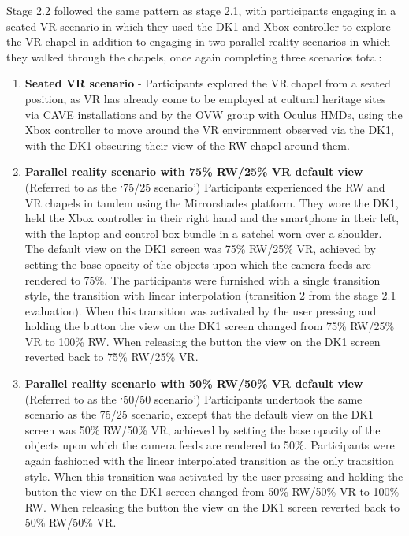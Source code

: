 Stage 2.2 followed the same pattern as stage 2.1, with participants engaging in a seated VR scenario in which they used the DK1 and Xbox controller to explore the VR chapel in addition to engaging in two parallel reality scenarios in which they walked through the chapels, once again completing three scenarios total:

\begin{enumerate}
	\item \textbf{Seated VR scenario} - Participants explored the VR chapel from a seated position, as VR has already come to be employed at cultural heritage sites via CAVE installations and by the OVW group with Oculus HMDs, using the Xbox controller to move around the VR environment observed via the DK1, with the DK1 obscuring their view of the RW chapel around them.
	\item \textbf{Parallel reality scenario with 75\% RW/25\% VR default view} - (Referred to as the `75/25 scenario') Participants experienced the RW and VR chapels in tandem using the Mirrorshades platform. They wore the DK1, held the Xbox controller in their right hand and the smartphone in their left, with the laptop and control box bundle in a satchel worn over a shoulder. The default view on the DK1 screen was 75\% RW/25\% VR, achieved by setting the base opacity of the objects upon which the camera feeds are rendered to 75\%. The participants were furnished with a single transition style, the transition with linear interpolation (transition 2 from the stage 2.1 evaluation). When this transition was activated by the user pressing and holding the button the view on the DK1 screen changed from 75\% RW/25\% VR to 100\% RW. When releasing the button the view on the DK1 screen reverted back to 75\% RW/25\% VR.
	\item \textbf{Parallel reality scenario with 50\% RW/50\% VR default view} - (Referred to as the `50/50 scenario') Participants undertook the same scenario as the 75/25 scenario, except that the default view on the DK1 screen was 50\% RW/50\% VR, achieved by setting the base opacity of the objects upon which the camera feeds are rendered to 50\%. Participants were again fashioned with the linear interpolated transition as the only transition style. When this transition was activated by the user pressing and holding the button the view on the DK1 screen changed from 50\% RW/50\% VR to 100\% RW. When releasing the button the view on the DK1 screen reverted back to 50\% RW/50\% VR.
\end{enumerate}

